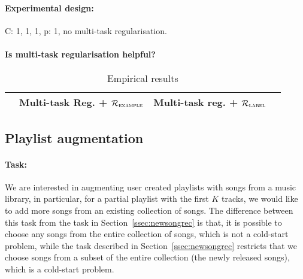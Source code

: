\paragraph{Experimental design:}
C: 1, 1, 1, p: 1, no multi-task regularisation.

\paragraph{Is multi-task regularisation helpful?}

\begin{table}[!h]
\centering
\caption{Empirical results}
\begin{tabular}{l|ccc}
\toprule
{}            & Multi-task Reg. + $\mathcal{R}_\textsc{example}$ & Multi-task reg. + $\mathcal{R}_\textsc{label}$ \\
\midrule
\bottomrule
\end{tabular}
\end{table}



\subsection{Playlist augmentation}
\label{ssec:pla}

\paragraph{Task:}
We are interested in augmenting user created playlists with songs from a music library,
in particular, for a partial playlist with the first $K$ tracks, 
we would like to add more songs from an existing collection of songs.
The difference between this task from the task in Section~\ref{ssec:newsongrec} is that,
it is possible to choose any songs from the entire collection of songs, which is not a cold-start problem,
while the task described in Section~\ref{ssec:newsongrec} restricts that 
we choose songs from a subset of the entire collection (the newly released songs), 
which is a cold-start problem.

